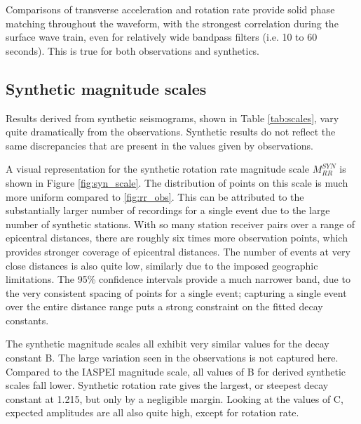 \documentclass{gji}
\begin{document}

Comparisons of transverse acceleration and rotation rate provide solid phase matching throughout the waveform, with the strongest correlation during the surface wave train, even for relatively wide bandpass filters (i.e. 10 to 60 seconds). This is true for both observations and synthetics.


\subsection{Synthetic magnitude scales}
Results derived from synthetic seismograms, shown in Table \ref{tab:scales}, vary quite dramatically from the observations. Synthetic results do not reflect the same discrepancies that are present in the values given by observations.

A visual representation for the synthetic rotation rate magnitude scale $M_{RR}^{SYN}$ is shown in Figure \ref{fig:syn_scale}. The distribution of points on this scale is much more uniform compared to \ref{fig:rr_obs}. This can be attributed to the substantially larger number of recordings for a single event due to the large number of synthetic stations. With so many station receiver pairs over a range of epicentral distances, there are roughly six times more observation points, which provides stronger coverage of epicentral distances. The number of events at very close distances is also quite low, similarly due to the imposed geographic limitations. The 95\% confidence intervals provide a much narrower band, due to the very consistent spacing of points for a single event; capturing a single event over the entire distance range puts a strong constraint on the fitted decay constants.

The synthetic magnitude scales all exhibit very similar values for the decay constant B. The large variation seen in the observations is not captured here. Compared to the IASPEI magnitude scale, all values of B for derived synthetic scales fall lower. Synthetic rotation rate gives the largest, or steepest decay constant at 1.215, but only by a negligible margin. Looking at the values of C, expected amplitudes are all also quite high, except for rotation rate.
\end{document}
